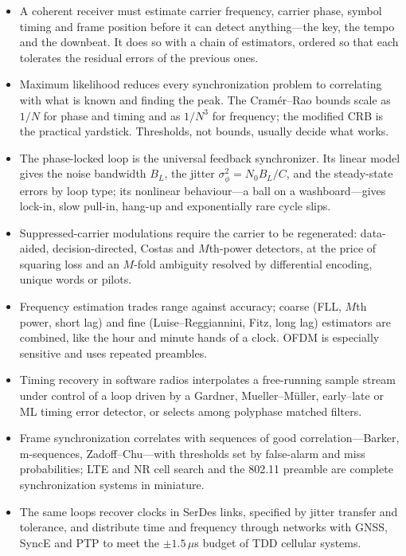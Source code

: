\begin{itemize}
\item A coherent receiver must estimate carrier frequency, carrier phase, symbol timing and frame
position before it can detect anything---the key, the tempo and the downbeat. It does so with a
chain of estimators, ordered so that each tolerates the residual errors of the previous ones.
\item Maximum likelihood reduces every synchronization problem to correlating with what is known and
finding the peak. The Cram\'er--Rao bounds scale as $1/N$ for phase and timing and as $1/N^3$ for
frequency; the modified CRB is the practical yardstick. Thresholds, not bounds, usually decide what
works.
\item The phase-locked loop is the universal feedback synchronizer. Its linear model gives the noise
bandwidth $B_L$, the jitter $\sigma_\phi^2=N_0B_L/C$, and the steady-state errors by loop type; its
nonlinear behaviour---a ball on a washboard---gives lock-in, slow pull-in, hang-up and exponentially
rare cycle slips.
\item Suppressed-carrier modulations require the carrier to be regenerated: data-aided,
decision-directed, Costas and $M$th-power detectors, at the price of squaring loss and an $M$-fold
ambiguity resolved by differential encoding, unique words or pilots.
\item Frequency estimation trades range against accuracy; coarse (FLL, $M$th power, short lag) and
fine (Luise--Reggiannini, Fitz, long lag) estimators are combined, like the hour and minute hands of
a clock. OFDM is especially sensitive and uses repeated preambles.
\item Timing recovery in software radios interpolates a free-running sample stream under control of a
loop driven by a Gardner, Mueller--M\"uller, early--late or ML timing error detector, or selects among
polyphase matched filters.
\item Frame synchronization correlates with sequences of good correlation---Barker, m-sequences,
Zadoff--Chu---with thresholds set by false-alarm and miss probabilities; LTE and NR cell search and the
802.11 preamble are complete synchronization systems in miniature.
\item The same loops recover clocks in SerDes links, specified by jitter transfer and tolerance, and
distribute time and frequency through networks with GNSS, SyncE and PTP to meet the $\pm1.5\,\mu$s
budget of TDD cellular systems.
\end{itemize}

